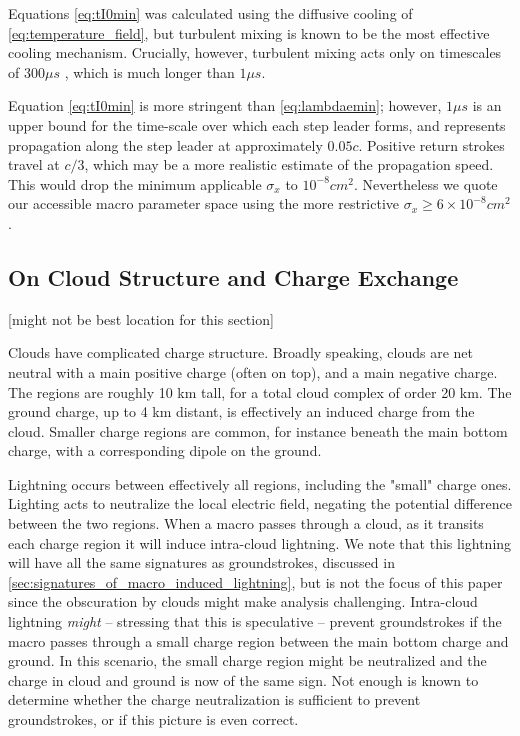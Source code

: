 \documentclass[%
 reprint,
 amsmath,amssymb,
 aps,
]{revtex4-2}
\begin{document}
        Equations \eqref{eq:tI0min} was calculated using the  diffusive cooling of \eqref{eq:temperature_field}, but turbulent mixing is known to be the most effective cooling mechanism. Crucially, however, turbulent mixing acts only on timescales of $300\mu{s}$ \citep{Picone1983}, which is much longer than $1\mu{s}$.

        Equation \eqref{eq:tI0min} is more stringent than \eqref{eq:lambdaemin}; however, $1\mu{s}$ is an upper bound for the time-scale over which each step leader forms, and represents propagation along the step leader at approximately $0.05c$.  Positive return strokes travel \cite{Idone1987} at $c/3$, which may be a more realistic estimate of the propagation speed. This would drop the minimum applicable $\sigma_x$ to $10^{-8}cm^2$. Nevertheless we quote our accessible macro  parameter space using the more restrictive  $\sigma_x \geq 6\times 10^{-8}cm^2$.


    \subsection{On Cloud Structure and Charge Exchange}
    [might not be best location for this section]

        Clouds have complicated charge structure. Broadly speaking, clouds are net neutral with a main positive charge (often on top), and a main negative charge. The regions are roughly 10 km tall, for a total cloud complex of order 20 km. The ground charge, up to 4 km distant, is effectively an induced charge from the cloud. Smaller charge regions are common, for instance beneath the main bottom charge, with a corresponding dipole on the ground.
        
        Lightning occurs between effectively all regions, including the "small" charge ones. Lighting acts to neutralize the local electric field, negating the potential difference between the two regions. When a macro passes through a cloud, as it transits each charge region it will induce intra-cloud lightning. We note that this lightning will have all the same signatures as groundstrokes, discussed in \ref{sec:signatures_of_macro_induced_lightning}, but is not the focus of this paper since the obscuration by clouds might make analysis challenging. Intra-cloud lightning \textit{might} -- stressing that this is speculative -- prevent groundstrokes if the macro passes through a small charge region between the main bottom charge and ground. In this scenario, the small charge region might be neutralized and the charge in cloud and ground is now of the same sign. Not enough is known to determine whether the charge neutralization is sufficient to prevent groundstrokes, or if this picture is even correct.
        
\end{document}
